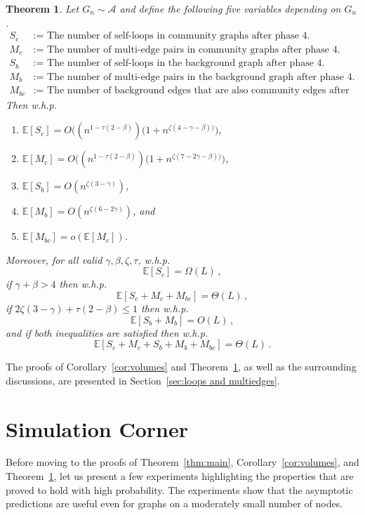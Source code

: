 \documentclass[12pt]{article}
\newtheorem{theorem}{Theorem}
\theoremstyle{definition}
\theoremstyle{remark}
\theoremstyle{remark}
\numberwithin{theorem}{section}
\newcommand{\E}[1]{{\mathbb E}\left[#1\right]}
\newcommand{\abcdDist}{\ensuremath{\mathcal{A}}}
\begin{document}
\begin{theorem}\label{thm:loops and multiedges}
Let $G_n \sim \abcdDist$ and define the following five variables depending on $G_n$. 
\begin{align*}
S_c &:= \text{ The number of self-loops in community graphs after phase~4.}\\
M_c &:= \text{ The number of multi-edge pairs in community graphs after phase~4.}\\
S_b &:= \text{ The number of self-loops in the background graph after phase~4.}\\
M_b &:= \text{ The number of multi-edge pairs in the background graph after phase~4.}\\
M_{bc} &:= \text{ The number of background edges that are also community edges after phase~4.}
\end{align*}
Then w.h.p.\
\begin{enumerate}
\item $\E{S_c} = O\Big((n^{1-\tau(2-\beta)})(1+n^{\zeta(4-\gamma-\beta))}\Big)$,
\item $\E{M_c} = O\Big((n^{1-\tau(2-\beta)})(1+n^{\zeta(7-2\gamma-\beta))}\Big)$,
\item $\E{S_b} = O(n^{\zeta(3-\gamma)})$,
\item $\E{M_b} = O(n^{\zeta(6-2\gamma)})$, and
\item $\E{M_{bc}} = o(\E{M_c})$.
\end{enumerate}
Moreover, for all valid $\gamma,\beta,\zeta,\tau$, w.h.p.\
\[
\E{S_c} = \Omega(L) \,,
\]
if $\gamma+\beta > 4$ then w.h.p.\
\[
\E{S_c + M_c + M_{bc}} = \Theta(L) \,,
\]
if $2\zeta(3-\gamma) + \tau(2-\beta) \leq 1$ then w.h.p.\
\[
\E{S_b + M_b} = O(L) \,,
\]
and if both inequalities are satisfied then w.h.p.\
\[
\E{S_c + M_c + S_b + M_b + M_{bc}} = \Theta(L) \,.
\]
\end{theorem}

The proofs of Corollary~\ref{cor:volumes} and Theorem~\ref{thm:loops and multiedges}, as well as the surrounding discussions, are presented in Section~\ref{sec:loops and multiedges}.

\section{Simulation Corner}\label{sec:simulations}

Before moving to the proofs of Theorem~\ref{thm:main}, Corollary~\ref{cor:volumes}, and Theorem~\ref{thm:loops and multiedges}, let us present a few experiments highlighting the properties that are proved to hold with high probability. The experiments show that the asymptotic predictions are useful even for graphs on a moderately small number of nodes.
\end{document}
